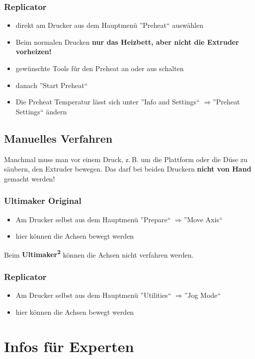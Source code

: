 \documentclass{\basedir/fablab-document}
\newcommand{\ts}[1]{\textsuperscript{#1}}
\newcommand{\ra}{$\Rightarrow$}
\begin{document}
\subsubsection{Replicator}
\begin{itemize}
 \item direkt am Drucker aus dem Hauptmenü ''Preheat`` auswählen
 \item Beim normalen Drucken \textbf{nur das Heizbett, aber nicht die Extruder vorheizen!}
 \item gewünschte Tools für den Preheat an oder aus schalten
 \item danach ''Start Preheat``
 \item Die Preheat Temperatur lässt sich unter ''Info and Settings`` \ra ''Preheat Settings`` ändern
\end{itemize}

\subsection{Manuelles Verfahren}\label{manuelles-verfahren}
Manchmal muss man vor einem Druck, z.\,B. um die Plattform oder die Düse zu säubern, den Extruder bewegen.
Das darf bei beiden Druckern \textbf{nicht von Hand} gemacht werden!

\subsubsection{Ultimaker Original}
\begin{itemize}
	\item Am Drucker selbst aus dem Hauptmenü ''Prepare`` \ra ''Move Axis``
	\item hier können die Achsen bewegt werden
\end{itemize}
Beim \textbf{Ultimaker\ts2} können die Achsen nicht verfahren werden.

\subsubsection{Replicator}
\begin{itemize}
 \item Am Drucker selbst aus dem Hauptmenü ''Utilities`` \ra ''Jog Mode``
 \item hier können die Achsen bewegt werden
\end{itemize}


\section{Infos für Experten}
\end{document}

